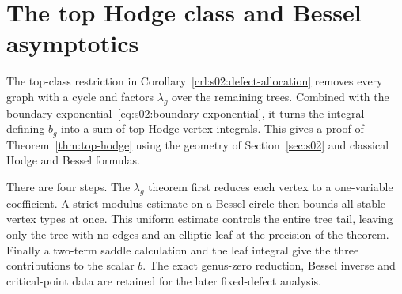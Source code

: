 \section{The top Hodge class and Bessel asymptotics}
\label{sec:s06}

The top-class restriction in
Corollary~\ref{crl:s02:defect-allocation} removes every graph with a
cycle and factors $\lambda_g$ over the remaining trees. Combined
with the boundary exponential~\eqref{eq:s02:boundary-exponential},
it turns the integral defining $b_g$
into a sum of top-Hodge vertex integrals. This gives a proof of
Theorem~\ref{thm:top-hodge} using the geometry of
Section~\ref{sec:s02} and classical Hodge and Bessel formulas.

There are four steps. The $\lambda_g$ theorem first reduces each
vertex to a one-variable coefficient. A strict modulus estimate on
a Bessel circle then bounds all stable vertex types at once. This
uniform estimate controls the entire tree tail, leaving only the
tree with no edges and an elliptic leaf at the precision of the theorem.
Finally a two-term saddle calculation and the leaf integral give
the three contributions to the scalar $b$. The exact genus-zero
reduction, Bessel inverse and critical-point data are retained for
the later fixed-defect analysis.





